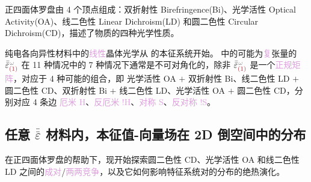\textcolor{NavyBlue}{正四面体罗盘}由 \textcolor{NavyBlue}{4 个顶点}组成：\textcolor{NavyBlue}{双折射性} Birefringence(\textcolor{NavyBlue}{Bi})、\textcolor{NavyBlue}{光学活性} Optical Activity(\textcolor{NavyBlue}{OA})、\textcolor{NavyBlue}{线二色性} Linear Dichroism(\textcolor{NavyBlue}{LD}) 和\textcolor{NavyBlue}{圆二色性} Circular Dichroism(\textcolor{NavyBlue}{CD})，描述了物质的四种\textcolor{NavyBlue}{光学性质}。

\textcolor{PineGreen}{纯电各向异性}材料中的\textcolor{Plum}{线性}\textcolor{PineGreen}{晶体光学}从  的\textcolor{PineGreen}{本征系统}开始。 中的可能为\textcolor{Plum}{复}张量的 $\bar{\bar{\varepsilon}}^{\;\! \mathcolor{gray}{\omega}}_{\textcolor{Maroon}{(1)}}$ 在 11 种情况中的 7 种情况下通常是不可对角化的，除非 $\bar{\bar{\varepsilon}}^{\;\! \mathcolor{gray}{\omega}}_{\textcolor{Maroon}{(1)}}$ 是一个\textcolor{Plum}{正规矩阵}，对应于 4 种可能的组合，即 \textcolor{NavyBlue}{光学活性 OA} $+$ \textcolor{NavyBlue}{双折射性 Bi}、\textcolor{NavyBlue}{线二色性 LD} $+$ \textcolor{NavyBlue}{圆二色性 CD}、\textcolor{NavyBlue}{双折射性 Bi} $+$ \textcolor{NavyBlue}{线二色性 LD}、\textcolor{NavyBlue}{光学活性 OA} $+$ \textcolor{NavyBlue}{圆二色性 CD}，分别对应 4 条边 \textcolor{Plum}{厄米 H}、\textcolor{Plum}{反厄米 $!$H}、\textcolor{Plum}{对称 S}、\textcolor{Plum}{反对称 $!$S}。

\vspace*{-4.5em}

\subsection{任意 \texorpdfstring{$\bar{\bar{\varepsilon}}$}{$\bar{\bar{\text{ε}}}$} 材料内，本征值-向量场在 2D 倒空间中的分布}\label{ssec:2D-reciprocal-eigensystems}

在\textcolor{NavyBlue}{正四面体罗盘}的帮助下，现开始探索\textcolor{NavyBlue}{圆二色性 CD}、\textcolor{NavyBlue}{光学活性 OA} 和\textcolor{NavyBlue}{线二色性 LD} 之间的\textcolor{Plum}{成对}/\textcolor{Plum}{两两竞争}，以及它如何影响\textcolor{PineGreen}{特征系统}对的分布的\textcolor{NavyBlue}{绝热演化}。

